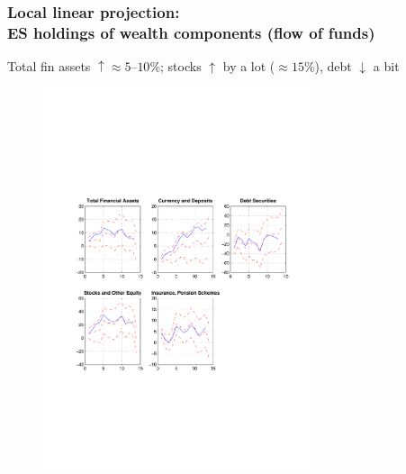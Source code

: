 \documentclass[pdflatex,aspectratio=169]{beamer}
\begin{document}
\begin{frame}\frametitle{\bf Local linear projection:  \\ {\large ES holdings of wealth components (flow of funds) } \hyperlink{Robust}{} \hypertarget{FoF}{}}
Total fin assets $\uparrow\approx5$--$10\%$; stocks $\uparrow$ by a lot ($\approx15\%$), debt $\downarrow$ a bit
\vspace*{-2mm}
\begin{figure}
\begin{center}
\includegraphics[width=0.7\textwidth]{./figures/fFof_ES}\\
\end{center}
\end{figure}

\end{frame}
\end{document}
